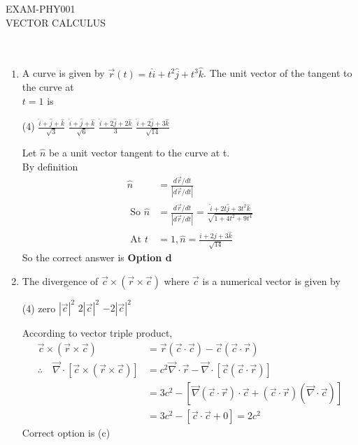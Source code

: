 \begin{abox}
	EXAM-PHY001\\ \vspace{0.6cm}
VECTOR CALCULUS
\end{abox}

\section*{}
$\left. \right.$ {}
\begin{enumerate}[label=\color{ocre}\textbf{\arabic*.}]

	
\item A curve is given by $\vec{r}(t)=t \hat{i}+t^{2} \hat{j}+t^{3} \hat{k}$. The unit vector of the tangent to the curve at\\$t=1$ is
\begin{tasks}(4)
	\task[\textbf{A.}] $\frac{\hat{i}+\hat{j}+\hat{k}}{\sqrt{3}}$
	\task[\textbf{B.}] $\frac{\hat{i}+\hat{j}+\hat{k}}{\sqrt{6}}$
	\task[\textbf{C.}] $\frac{\hat{i}+2 \hat{j}+2 \hat{k}}{3}$
	\task[\textbf{D.}] $\frac{\hat{i}+2 \hat{j}+3 \hat{k}}{\sqrt{14}}$
\end{tasks}
\begin{answer}
	Let $\hat{n}$ be a unit vector tangent to the curve at t.\\
	By definition  
	\begin{align*}
	\hat{n}&=\frac{d \vec{r} / d t}{|d \vec{r} / d t|}\\
	\text{ So } \hat{n}&=\frac{d \vec{r} / d t}{|d \vec{r} / d t|}=\frac{\hat{i}+2t \hat{j}+3 t^{2} \hat{k}}{\sqrt{1+4 t^{2}+9 t^{4}}}\\
	\text{ At } t&=1, \hat{n}=\frac{\hat{i}+2 j+3 \hat{k}}{\sqrt{14}}
	\end{align*}
	So the correct answer is \textbf{Option d}
\end{answer}
	\item The divergence of $\vec{c} \times(\vec{r} \times \vec{c})$ where $\vec{c}$ is a numerical vector is given by 

\begin{tasks}(4)
	\task[\textbf{A.}] zero
	\task[\textbf{B.}]  $|\vec{c}|^{2}$
	\task[\textbf{C.}] $2|\vec{c}|^{2}$
	\task[\textbf{D.}] $-2|\vec{c}|^{2}$
\end{tasks}
\begin{answer}
	According to vector triple product,
	\begin{align*} \vec{c} \times(\vec{r} \times \vec{c})&= \vec{r}(\vec{c} \cdot \vec{c})-\vec{c}(\vec{c} \cdot \vec{r}) \\ \therefore \quad \vec{\nabla} \cdot[\vec{c} \times(\vec{r} \times \vec{c})] &=c^{2} \vec{\nabla} \cdot \vec{r}-\vec{\nabla} \cdot[\vec{c}(\vec{c} \cdot \vec{r})] \\ &=3 c^{2}-[\vec{\nabla}(\vec{c} \cdot \vec{r}) \cdot \vec{c}+(\vec{c} \cdot \vec{r})(\vec{\nabla} \cdot \vec{c})] \\ &=3 c^{2}-[\vec{c} \cdot \vec{c}+0]=2 c^{2} \end{align*}
	Correct option is (c)
\end{answer}



\end{enumerate}

